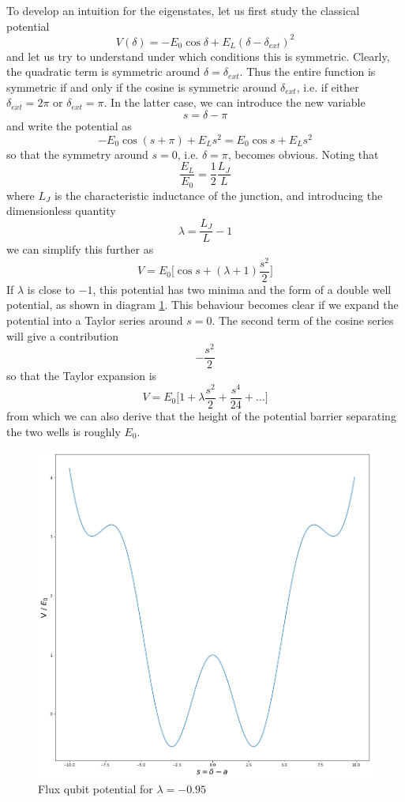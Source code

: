 \documentclass[a4paper, draft]{article}
\theoremstyle{own}
\theoremstyle{remark}
\begin{document}
To develop an intuition for the eigenstates, let us first study the classical potential
$$
V(\delta) = - E_0 \cos \delta + E_L ( \delta  - \delta_{ext})^2
$$
and let us try to understand under which conditions this is symmetric. Clearly, the quadratic term is symmetric around $\delta = \delta_{ext}$. Thus the entire function is symmetric if and only if the cosine is symmetric around $\delta_{ext}$, i.e. if either $\delta_{ext} = 2\pi$ or $\delta_{ext} = \pi$. In the latter case, we can introduce the new variable
$$
s = \delta - \pi
$$
and write the potential as
$$
- E_0 \cos (s + \pi) + E_L s^2 = E_0 \cos s + E_L s^2
$$
so that the symmetry around $s = 0$, i.e. $\delta = \pi$, becomes obvious. Noting that
$$
\frac{E_L}{E_0} = \frac{1}{2} \frac{L_J}{L}
$$ 
where $L_J$ is the characteristic inductance of the junction, and introducing the dimensionless quantity 
$$
\lambda = \frac{L_J}{L} - 1
$$
we can simplify this further as
$$
V = E_0 \big[ \cos s + (\lambda + 1) \frac{s^2}{2}\big] 
$$
If $\lambda $ is close to $-1$, this potential has two minima and the form of a double well potential, as shown in diagram \ref{fig:FluxQubitDoubleWellPotential}. This behaviour becomes clear if we expand the potential into a Taylor series around $s = 0$. The second term of the cosine series will give a contribution 
$$
- \frac{s^2}{2}
$$
so that the Taylor expansion is
$$
V = E_0 \big[ 1 + \lambda \frac{s^2}{2} + \frac{s^4}{24} + \dots \big] 
$$
from which we can also derive that the height of the potential barrier separating the two wells is roughly $E_0$. 

\begin{figure}[ht]
\centering
\includegraphics[width=0.7\linewidth]{images/FluxQubitDoubleWellPotential}
\caption[Flux qubit potential for $\lambda = -0.95$]{Flux qubit potential for $\lambda = -0.95$}
\label{fig:FluxQubitDoubleWellPotential}
\end{figure}
\end{document}
